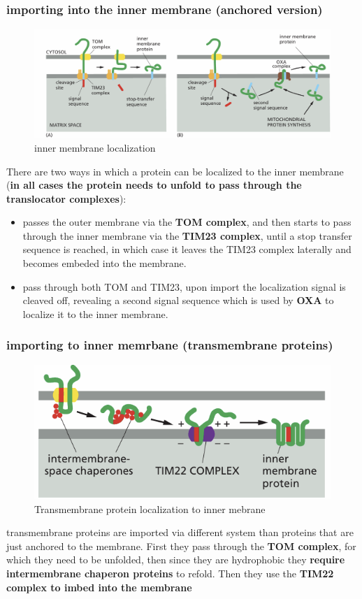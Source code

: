 \documentclass[../main.tex]{subfiles}
\begin{document}
\subsubsection{importing into the inner membrane (anchored version)}
\begin{figure}[H]
    \centering
    \includegraphics[width=\linewidth]{innerMembrane.png}
    \caption{inner membrane localization}
    \label{fig:enter-label}
\end{figure}
There are two ways in which a protein can be localized to the inner membrane (\textbf{in all cases the protein needs to unfold to pass through the translocator complexes}):
\begin{itemize}
    \item passes the outer membrane via the\textbf{ \gls{TOM} complex}, and then starts to pass through the inner membrane via the\textbf{ \gls{TIM23} complex}, until a stop transfer sequence is reached, in which case it leaves the TIM23 complex laterally and becomes embeded into the membrane.

    \item pass through both TOM and TIM23, upon import the localization signal is cleaved off, revealing a second signal sequence which is used by \textbf{\gls{OXA}} to localize it to the inner membrane.    
\end{itemize}
\subsubsection{importing to inner memrbane (transmembrane proteins)}
\begin{figure}[H]
    \centering
    \includegraphics[width=0.7\linewidth]{transmembraneMitochondria.png}
    \caption{Transmembrane protein localization to inner mebrane}
    \label{fig:enter-label}
\end{figure}
transmembrane proteins are imported via different system than proteins that are just anchored to the membrane. First they pass through the \textbf{\gls{TOM} complex}, for which they need to be unfolded, then since they are hydrophobic they \textbf{require intermembrane chaperon proteins} to refold. Then they use the\textbf{ \gls{TIM22} complex to imbed into the membrane}
\end{document}
